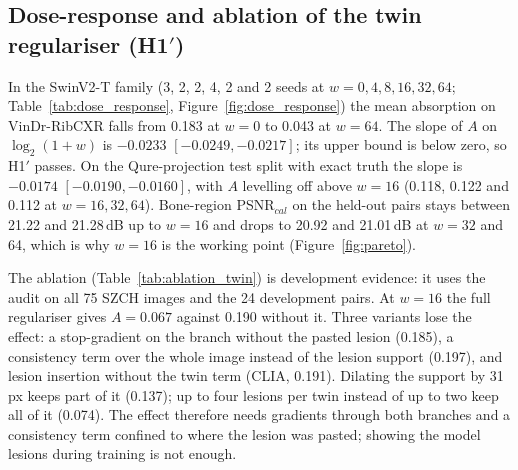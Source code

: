 \begin{table}[htbp]
\centering\small
\caption{SAP\_v5 hypotheses (exploratory): paired differences with image bootstrap (H16, H16b, H17: one-sided 95\,\% lower bounds) or
image-cluster bootstrap intervals (absorption on 1,470 VinDr-RibCXR sites), \num{10000} resamples.}
\label{tab:sitecal_tests}
\end{table}
\begin{table}[htbp]
\centering\small
\caption{VinDr-RibCXR (metrics only): mean lesion absorption of one audit run with all four models (shared sites) and the rib benchmark,
as is and site-calibrated (exploratory, SAP\_v5).}
\label{tab:sitecal_ribcxr}
\end{table}

\subsection{Dose-response and ablation of the twin regulariser (\texorpdfstring{H1$'$}{H1'})}
\label{sec:res_twin}
In the SwinV2-T family (3, 2, 2, 4, 2 and 2 seeds at $w=0,4,8,16,32,64$; Table~\ref{tab:dose_response}, Figure~\ref{fig:dose_response}) the
mean absorption on VinDr-RibCXR falls from 0.183 at $w=0$ to 0.043 at $w=64$. The slope of $A$ on $\log_2(1+w)$ is $-0.0233$
$[-0.0249,-0.0217]$; its upper bound is below zero, so H1$'$ passes. On the Qure-projection test split with exact truth the slope is
$-0.0174$ $[-0.0190,-0.0160]$, with $A$ levelling off above $w=16$ (0.118, 0.122 and 0.112 at $w=16,32,64$). Bone-region PSNR$_{cal}$ on the
held-out pairs stays between 21.22 and 21.28\,dB up to $w=16$ and drops to 20.92 and 21.01\,dB at $w=32$ and 64, which is why $w=16$ is the
working point (Figure~\ref{fig:pareto}).

The ablation (Table~\ref{tab:ablation_twin}) is development evidence: it uses the audit on all 75 SZCH images and the 24 development pairs.
At $w=16$ the full regulariser gives $A=0.067$ against 0.190 without it. Three variants lose the effect: a stop-gradient on the branch without
the pasted lesion (0.185), a consistency term over the whole image instead of the lesion support (0.197), and lesion insertion without the twin
term (CLIA, 0.191). Dilating the support by 31\,px keeps part of it (0.137); up to four lesions per twin instead of up to two keep all of it (0.074).
The effect therefore needs gradients through both branches and a consistency term confined to where the lesion was pasted; showing the model
lesions during training is not enough.

